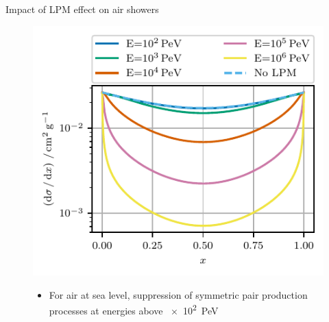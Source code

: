 \documentclass[t]{beamer}
\begin{document}
\begin{columns}[onlytextwidth]
\begin{column}{0.45\textwidth}
\begin{block}[equal height group=PLOTS]{Impact of LPM effect on air showers}
              \begin{figure}
              \begin{minipage}[t]{0.49\textwidth}
                \includegraphics[width=\linewidth, keepaspectratio]{../plots/lpm_photopair_differential_small.pdf}
                \vspace{-1.5cm}
                \begin{itemize}
                  \item For air at sea level, suppression of symmetric pair production processes at energies above \SI{e2}{\peta\electronvolt}


\end{itemize}
\end{minipage}
\end{figure}
\end{block}
\end{column}
\end{columns}
\end{document}
